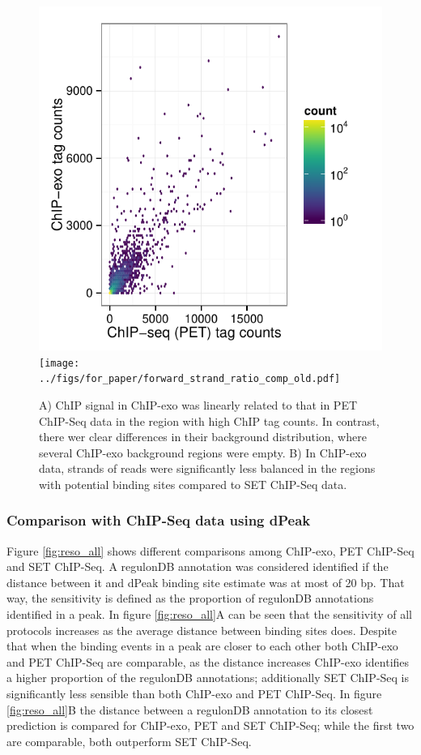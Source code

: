 \documentclass{bmcart}\usepackage[]{graphicx}\usepackage[]{color}
\begin{document}
\begin{figure}[h]
  \centering
  \includegraphics[width = .46\textwidth,page = 3 ]{../figs/for_paper/ChIPseqPET_ChIPexo_tagCount_comparison.pdf}
  \texttt{[image: ../figs/for\_paper/forward\_strand\_ratio\_comp\_old.pdf]}
  \caption{ A) ChIP signal in ChIP-exo was linearly related to that in
    PET ChIP-Seq data in the region with high ChIP tag counts. In
    contrast, there wer clear differences in their background
    distribution, where several ChIP-exo background regions were
    empty. B) In ChIP-exo data, strands of reads were significantly
    less balanced in the regions with potential binding sites compared
    to SET ChIP-Seq data. }
  \label{fig:comp}
\end{figure}


\subsubsection{Comparison with ChIP-Seq data using dPeak}
\label{sec:dpeak_analysis}



Figure \ref{fig:reso_all} shows different comparisons among ChIP-exo,
PET ChIP-Seq and SET ChIP-Seq. A regulonDB annotation was considered
identified if the distance between it and dPeak binding site estimate
was at most of 20 bp. That way, the sensitivity is defined as
the proportion of regulonDB annotations identified in a peak. In
figure \ref{fig:reso_all}A can be seen that the sensitivity of all
protocols increases as the average distance between binding sites
does. Despite that when the binding events in a peak are closer to
each other both ChIP-exo and PET ChIP-Seq are comparable, as the
distance increases ChIP-exo identifies a higher proportion of the
regulonDB annotations; additionally SET ChIP-Seq is significantly less
sensible than both ChIP-exo and PET ChIP-Seq. In figure
\ref{fig:reso_all}B the distance between a regulonDB annotation to its
closest prediction is compared for ChIP-exo, PET and SET ChIP-Seq;
while the first two are comparable, both outperform SET
ChIP-Seq. 
\end{document}

